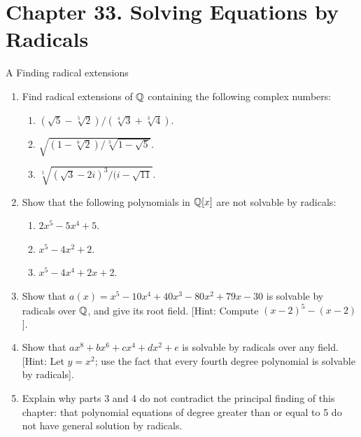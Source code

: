 \section*{Chapter 33. Solving Equations by Radicals}


\begin{exercise}{A Finding radical extensions}
\begin{enumerate}
    \item Find radical extensions of $\mathbb{Q}$ containing the following complex numbers:
    \begin{enumerate}
        \item $(\sqrt{5}-\sqrt[5]{2})/(\sqrt[4]{3}+\sqrt[3]{4})$.
        \item $\sqrt{(1-\sqrt[9]{2})/\sqrt[3]{1-\sqrt{5}}}$.
        \item $\sqrt[5]{(\sqrt{3}-2i)^3/(i-\sqrt{11}}$.
    \end{enumerate}
    \item Show that the following polynomials in $\mathbb{Q}[x]$ are not solvable by radicals:
    \begin{enumerate}
        \item $2x^5-5x^4+5$.
        \item $x^5-4x^2+2$.
        \item $x^5-4x^4+2x+2$.
    \end{enumerate}
    \item Show that $a(x)=x^5-10x^4+40x^3-80x^2+79x-30$ is solvable by radicals over $\mathbb{Q}$, and give its root field. [Hint: Compute $(x-2)^5-(x-2)$].
    \item Show that $ax^8+bx^6+cx^4+dx^2+e$ is solvable by radicals over any field. [Hint: Let $y=x^2$; use the fact that every fourth degree polynomial is solvable by radicals].
    \item Explain why parts 3 and 4 do not contradict the principal finding of this chapter: that polynomial equations of degree greater than or equal to 5 do not have general solution by radicals.
\end{enumerate}
\end{exercise}
